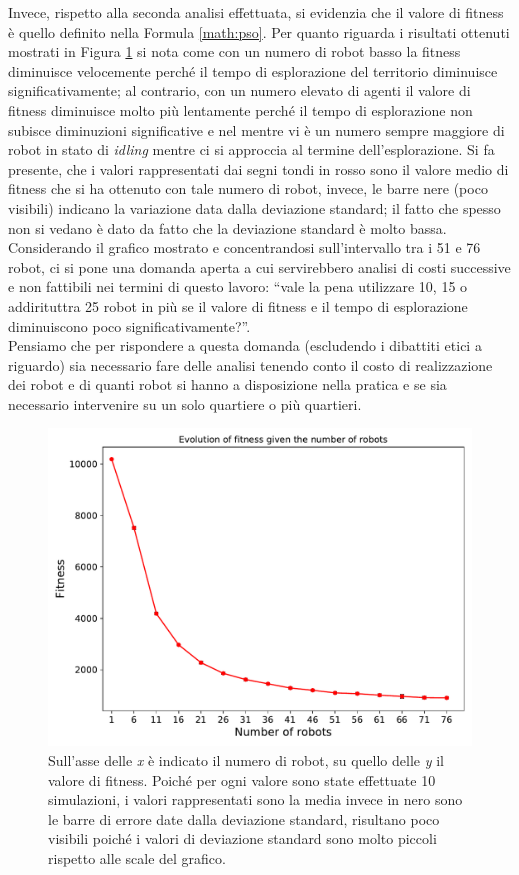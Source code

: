 Invece, rispetto alla seconda analisi effettuata, si evidenzia che il valore di fitness è quello definito nella Formula \ref{math:pso}.
Per quanto riguarda i risultati ottenuti mostrati in Figura \ref{fig:fitness} si nota come con un numero di robot basso la fitness diminuisce velocemente perché il tempo di esplorazione del territorio diminuisce significativamente; al contrario, con un numero elevato di agenti il valore di fitness diminuisce molto più lentamente perché il tempo di esplorazione non subisce diminuzioni significative e nel mentre vi è un numero sempre maggiore di robot in stato di \textit{idling} mentre ci si approccia al termine dell'esplorazione.
Si fa presente, che i valori rappresentati dai segni tondi in rosso sono il valore medio di fitness che si ha ottenuto con tale numero di robot, invece, le barre nere (poco visibili) indicano la variazione data dalla deviazione standard; il fatto che spesso non si vedano è dato da fatto che la deviazione standard è molto bassa.
Considerando il grafico mostrato e concentrandosi sull'intervallo tra i 51 e 76 robot, ci si pone una domanda aperta a cui servirebbero analisi di costi successive e non fattibili nei termini di questo lavoro: “vale la pena utilizzare 10, 15 o addirituttra 25 robot in più se il valore di fitness e il tempo di esplorazione diminuiscono poco significativamente?”.\\
Pensiamo che per rispondere a questa domanda (escludendo i dibattiti etici a riguardo) sia necessario fare delle analisi tenendo conto il costo di realizzazione dei robot e di quanti robot si hanno a disposizione nella pratica e se sia necessario intervenire su un solo quartiere o più quartieri.
\begin{figure}
	\centering
	\includegraphics[width=0.9\linewidth]{images/macro_results/fitness}
	\caption{Sull'asse delle \textit{x} è indicato il numero di robot, su quello delle \textit{y} il valore di fitness. Poiché per ogni valore sono state effettuate 10 simulazioni, i valori rappresentati sono la media invece in nero sono le barre di errore date dalla deviazione standard, risultano poco visibili poiché i valori di deviazione standard sono molto piccoli rispetto alle scale del grafico.}
	\label{fig:fitness}
\end{figure}

